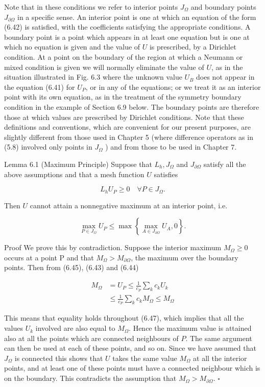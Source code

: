\documentclass[10pt]{article}
\begin{document}
Note that in these conditions we refer to interior points \(J_{\Omega}\) and boundary points \(J_{\partial \Omega}\) in a specific sense. An interior point is one at which an equation of the form (6.42) is satisfied, with the coefficients satisfying the appropriate conditions. A boundary point is a point which appears in at least one equation but is one at which no equation is given and the value of \(U\) is prescribed, by a Dirichlet condition. At a point on the boundary of the region at which a Neumann or mixed condition is given we will normally eliminate the value of \(U\), as in the situation illustrated in Fig. 6.3 where the unknown value \(U_{B}\) does not appear in the equation (6.41) for \(U_{P}\), or in any of the equations; or we treat it as an interior point with its own equation, as in the treatment of the symmetry boundary condition in the example of Section 6.9 below. The boundary points are therefore those at which values are prescribed by Dirichlet conditions. Note that these definitions and conventions, which are convenient for our present purposes, are slightly different from those used in Chapter 5 (where difference operators as in (5.8) involved only points in \(J_{\Omega}\) ) and from those to be used in Chapter 7.

Lemma 6.1 (Maximum Principle) Suppose that \(L_{h}, J_{\Omega}\) and \(J_{\partial \Omega}\) satisfy all the above assumptions and that a mesh function \(U\) satisfies

\[
L_{h} U_{P} \geq 0 \quad \forall P \in J_{\Omega} .
\]

Then \(U\) cannot attain a nonnegative maximum at an interior point, i.e.

\[
\max _{P \in J_{\Omega}} U_{P} \leq \max \left\{\max _{A \in J_{\partial \Omega}} U_{A}, 0\right\} .
\]

Proof We prove this by contradiction. Suppose the interior maximum \(M_{\Omega} \geq 0\) occurs at a point P and that \(M_{\Omega}>M_{\partial \Omega}\), the maximum over the boundary points. Then from (6.45), (6.43) and (6.44)

\[
\begin{aligned}
M_{\Omega} & =U_{P} \leq \frac{1}{c_{P}} \sum_{k} c_{k} U_{k} \\
& \leq \frac{1}{c_{P}} \sum_{k} c_{k} M_{\Omega} \leq M_{\Omega}
\end{aligned}
\]

This means that equality holds throughout (6.47), which implies that all the values \(U_{k}\) involved are also equal to \(M_{\Omega}\). Hence the maximum value is attained also at all the points which are connected neighbours of \(P\). The same argument can then be used at each of these points, and so on. Since we have assumed that \(J_{\Omega}\) is connected this shows that \(U\) takes the same value \(M_{\Omega}\) at all the interior points, and at least one of these points must have a connected neighbour which is on the boundary. This contradicts the assumption that \(M_{\Omega}>M_{\partial \Omega}\). \(\square\)
\end{document}
